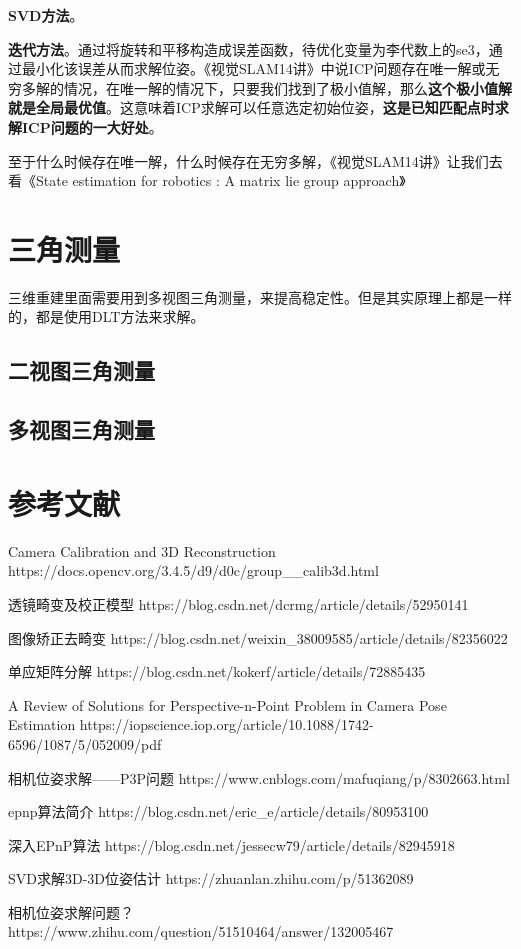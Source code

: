 \textbf{SVD方法}。


\textbf{迭代方法}。通过将旋转和平移构造成误差函数，待优化变量为李代数上的se3，通过最小化该误差从而求解位姿。《视觉SLAM14讲》中说ICP问题存在唯一解或无穷多解的情况，在唯一解的情况下，只要我们找到了极小值解，那么\textbf{这个极小值解就是全局最优值}。这意味着ICP求解可以任意选定初始位姿，\textbf{这是已知匹配点时求解ICP问题的一大好处}。

\begin{note}
	至于什么时候存在唯一解，什么时候存在无穷多解，《视觉SLAM14讲》让我们去看《State estimation for robotics : A matrix lie group approach》
\end{note}


\section{三角测量}
三维重建里面需要用到多视图三角测量，来提高稳定性。但是其实原理上都是一样的，都是使用DLT方法来求解。

\subsection{二视图三角测量}



\subsection{多视图三角测量}



\section{参考文献}

Camera Calibration and 3D Reconstruction
https://docs.opencv.org/3.4.5/d9/d0c/group\_\_calib3d.html

透镜畸变及校正模型
https://blog.csdn.net/dcrmg/article/details/52950141


图像矫正去畸变
https://blog.csdn.net/weixin\_38009585/article/details/82356022


单应矩阵分解
https://blog.csdn.net/kokerf/article/details/72885435

A Review of Solutions for Perspective-n-Point Problem in Camera Pose Estimation
https://iopscience.iop.org/article/10.1088/1742-6596/1087/5/052009/pdf


相机位姿求解——P3P问题
https://www.cnblogs.com/mafuqiang/p/8302663.html

epnp算法简介
https://blog.csdn.net/eric\_e/article/details/80953100

深入EPnP算法
https://blog.csdn.net/jessecw79/article/details/82945918

SVD求解3D-3D位姿估计
https://zhuanlan.zhihu.com/p/51362089


相机位姿求解问题？
https://www.zhihu.com/question/51510464/answer/132005467



